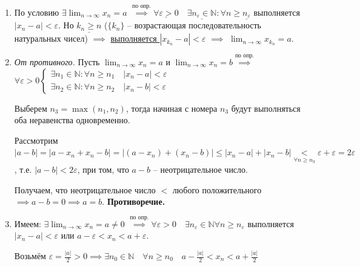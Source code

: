 \documentclass{article}
\newcommand{\bydef}{\stackrel{\text{по опр.}}{\implies}} %
\newcommand{\dslim}{\displaystyle\lim}
\newcommand{\dslimn}{\dslim_{n \to \infty}}
\theoremstyle{break}
\begin{document}
\begin{enumerate}
    \item По условию $\exists \dslimn x_n = a$
    $\bydef \underline{\forall \varepsilon > 0}
    \quad \underline{\exists n_\varepsilon \in \mathbb{N}}: 
    \forall n \ge \underline{n_\varepsilon}$ выполняется 
    $\left| x_n - a \right| < \varepsilon$. Но $\underline{k_n \ge n}$
    ($\{k_n\}$ -- возрастающая последовательность натуральных чисел)
    $\implies$ \underline{выполняется $\left| x_{k_n} - a \right| < \varepsilon$}
    $\implies$ $\dslimn x_{k_n} = a$.

    \item \textit{От противного.} Пусть $\dslimn x_n = a$ и
    $\dslimn x_n = b \bydef$
    $\forall \varepsilon > 0 \begin{cases}
        \exists n_1 \in \mathbb{N}: \forall n \ge n_1 \quad \left| x_n - a \right| < \varepsilon \\
        \exists n_2 \in \mathbb{N}: \forall n \ge n_2 \quad \left| x_n - b \right| < \varepsilon
    \end{cases}$

    Выберем $n_3 = \max \left( n_1, n_2 \right)$, тогда начиная с номера $n_3$ будут выполняться оба
    неравенства одновременно.

    Рассмотрим $\left| a - b \right| = \left| a - x_n + x_n - b \right| = 
    \left| (a - x_n) + (x_n - b) \right| \le \left| x_n - a \right| + 
    \left| x_n - b \right| \underset{\forall n \ge n_3}{<}
    \varepsilon + \varepsilon = 2 \varepsilon$, т.е. $\left| a - b \right| < 2 \varepsilon$,
    при том, что $a - b$ -- неотрицательное число.

    Получаем, что неотрицательное число $<$ любого положительного 
    $\implies a - b = 0 \implies a = b$. \textbf{Противоречие.}

    \item Имеем: $\exists \dslimn x_n = a \ne 0$
    $\bydef \forall \varepsilon > 0 \quad \exists n_\varepsilon \in \mathbb{N} 
    \forall n \ge n_\varepsilon$ выполняется $\left| x_n - a \right| < \varepsilon$
    или $a - \varepsilon < x_n < a + \varepsilon$.
    
    Возьмём $\varepsilon = \frac{\left| a \right|}{2} > 0 \implies 
    \exists n_0 \in \mathbb{N} \quad \forall n \ge n_0 \quad
    a - \frac{\left| a \right|}{2} < x_n < a + \frac{\left| a \right|}{2}$


\end{enumerate}
\end{document}

